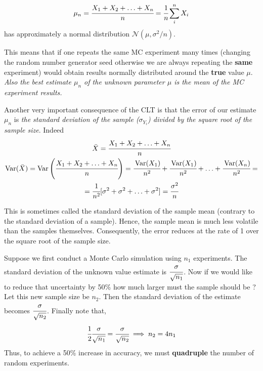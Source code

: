 \begin{equation*} 
\mu_n = \cfrac{X_1 + X_2 +\ldots + X_n}{n} = \cfrac{1}{n}\sum_i^n X_i
\end{equation*}
has approximately a normal distribution $\mathcal{N}(\mu, \sigma^2/n)$.

This means that if one repeats the same MC experiment many times (changing the random number generator seed otherwise we are always repeating the \textbf{same} experiment) would obtain results normally distributed around the \textbf{true} value $\mu$. \emph{Also the best estimate $\mu_n$ of the unknown parameter $\mu$ is the mean of the MC experiment results.}

Another very important consequence of the CLT is that the error of our estimate $\mu_n$ is \emph{the standard deviation of the sample ($\sigma_{Y_i}$) divided by the square root of the sample size}. Indeed
\begin{equation*}
\begin{gathered}
\bar{X} = \cfrac{X_1 + X_2 +\ldots +X_n}{n}\\
\operatorname{Var}(\bar{X}) = \operatorname{Var}\left(\cfrac{X_1 + X_2 +\ldots +X_n}{n}\right)=\cfrac{\operatorname{Var}(X_1)}{n^2}+\cfrac{\operatorname{Var}(X_1)}{n^2}+\ldots+\cfrac{\operatorname{Var}(X_n)}{n^2} = \\
=\cfrac{1}{n^2}[\sigma^2+\sigma^2+\ldots+\sigma^2] = \cfrac{\sigma^2}{n}
\end{gathered}
\end{equation*}

This is sometimes called the standard deviation of the sample mean (contrary to the standard deviation of a sample). Hence, the sample mean is much less volatile than the samples themselves. Consequently, the error reduces at the rate of 1 over the square root of the sample size. 

Suppose we first conduct a Monte Carlo simulation using $n_1$ experiments. The standard deviation of the unknown value estimate is $\cfrac{\sigma}{\sqrt{n_1}}$. Now if we would like to reduce that uncertainty by 50\% how much larger must the sample should be ? Let this new sample size be $n_2$. Then the standard deviation of the estimate becomes $\cfrac{\sigma}{\sqrt{n_2}}$.
Finally note that,
\begin{equation*}
  \cfrac{1}{2}\cfrac{\sigma}{\sqrt{n_1}}  = \cfrac{\sigma}{\sqrt{n_2}} \implies n_2 = 4 n_1
\end{equation*}
Thus, to achieve a 50\% increase in accuracy, we must \textbf{quadruple} the number of random experiments.











